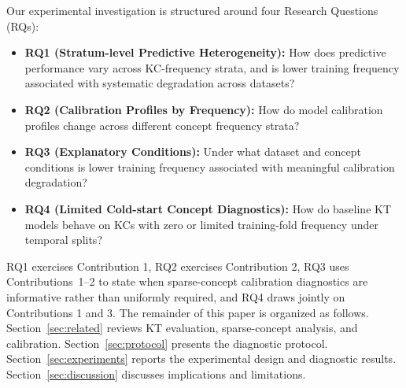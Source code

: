 Our experimental investigation is structured around four Research Questions (RQs):
\begin{itemize}
    \item \textbf{RQ1 (Stratum-level Predictive Heterogeneity):} How does predictive performance vary across KC-frequency strata, and is lower training frequency associated with systematic degradation across datasets?
    \item \textbf{RQ2 (Calibration Profiles by Frequency):} How do model calibration profiles change across different concept frequency strata?
    \item \textbf{RQ3 (Explanatory Conditions):} Under what dataset and concept conditions is lower training frequency associated with meaningful calibration degradation?
    \item \textbf{RQ4 (Limited Cold-start Concept Diagnostics):} How do baseline KT models behave on KCs with zero or limited training-fold frequency under temporal splits?
\end{itemize}

RQ1 exercises Contribution 1, RQ2 exercises Contribution 2, RQ3 uses Contributions~1--2 to state when sparse-concept calibration diagnostics are informative rather than uniformly required, and RQ4 draws jointly on Contributions 1 and 3. The remainder of this paper is organized as follows. Section~\ref{sec:related} reviews KT evaluation, sparse-concept analysis, and calibration. Section~\ref{sec:protocol} presents the diagnostic protocol. Section~\ref{sec:experiments} reports the experimental design and diagnostic results. Section~\ref{sec:discussion} discusses implications and limitations.
